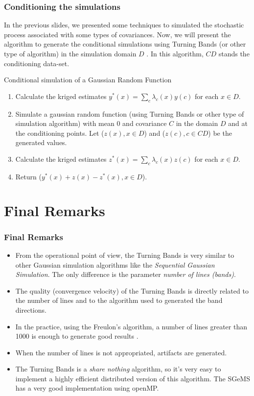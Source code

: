 \documentclass{beamer}
\begin{document}
\begin{frame}
\frametitle{Conditioning the simulations}
 In the previous slides, we presented some techniques to simulated the stochastic process associated with some types of covariances. Now,
 we will present the algorithm to generate the conditional simulations using Turning Bands (or other type of algorithm)
 in the simulation domain $D$ \cite{l2002}. 
 In this algorithm, $CD$ stands the conditioning data-set.
 
\begin{block}{Conditional simulation of a Gaussian Random Function}
 \begin{enumerate}
  \item Calculate the kriged estimates $y^{*}(x)=\sum_c\lambda_c(x)y(c)$ for each $x \in D$.
  \item Simulate a gaussian random function (using Turning Bands or other type of simulation algorithm) with mean $0$ and covariance $C$
  in the domain $D$ and at the conditioning points. Let ($z(x), x \in D$) and ($z(c), c \in CD$) be the generated values.
  \item Calculate the kriged estimates $z^{*}(x) = \sum_c\lambda_c(x)z(c)$ for each $x \in D$.
  \item Return ($y^{*}(x) + z(x) - z^{*}(x), x \in D$).
 \end{enumerate}

\end{block}

\end{frame}


\section{Final Remarks}
\begin{frame}
 \frametitle{Final Remarks}
 \begin{itemize}
  \item From the operational point of view, the Turning Bands is very similar to other Gaussian simulation algorithms like the
  \textit{Sequential Gaussian Simulation}. The only difference is the parameter \textit{number of lines (bands)}.
  \item The quality (convergence velocity) of the Turning Bands is directly related to the number of lines and to the algorithm
  used to generated the band directions.
  \item In the practice, using the Freulon's algorithm, a number of lines greater than 1000 is enough to generate good results \cite{e2006}.
  \item When the number of lines is not appropriated, artifacts are generated.
  \item The Turning Bands is a \textit{share nothing} algorithm, so it's very easy to implement a highly efficient distributed version
  of this algorithm. The SGeMS has a very good implementation using openMP.
 \end{itemize}
\end{frame}
\end{document}
